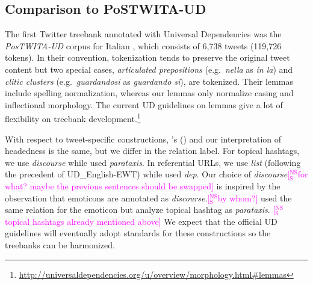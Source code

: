\documentclass[11pt,a4paper]{article}
\newcommand{\citeposs}[2][]{\citeauthor{#2}'s (\citeyear[#1]{#2})}
\newcommand{\yjcomment}[1]{\textcolor{orange}{[$_\mathrm{L}^\mathrm{Y}$#1]}}
\newcommand{\nss}[1]{\textcolor{magenta}{[$_\mathrm{S}^\mathrm{NS}$#1]}}
\begin{document}
\subsection{Comparison to PoSTWITA-UD}\label{sec:postwita}
The first Twitter treebank annotated with Universal Dependencies 
was the \mbox{\textit{PosTWITA-UD}} corpus for Italian \citep{sanguinetti-17}, 
which consists of 6,738 tweets (119,726 tokens).
In their convention, tokenization tends to preserve the original
tweet content but two special cases, \textit{articulated prepositions}
(e.g.~\textit{nella} as \textit{in la})
and \textit{clitic clusters} (e.g.~\textit{guardandosi} as \textit{guardando si}), are tokenized.
Their lemmas include spelling normalization, whereas our lemmas only normalize casing and inflectional morphology.
The current UD guidelines on lemmas give a lot of flexibility on treebank development.\footnote{\url{http://universaldependencies.org/u/overview/morphology.html\#lemmas}}

With respect to tweet-specific constructions,
\citeposs{sanguinetti-17} and our  interpretation of headedness is the same, 
but we differ in the relation label.
For topical hashtags, we use \textit{discourse} while \citet{sanguinetti-17} used \textit{parataxis}. 
In referential URLs, we use \textit{list} (following the precedent of UD\_English-EWT) while \citet{sanguinetti-17} used \textit{dep}.
Our choice of \textit{discourse}\nss{for what? maybe the previous sentences should be swapped} is inspired by the observation that emoticons are annotated as \textit{discourse}.\nss{by whom?}
\citet{sanguinetti-17} used the same relation for the emoticon but analyze topical hashtag as \textit{parataxis}.
\nss{topical hashtags already mentioned above}
We expect that the official UD guidelines will eventually adopt standards for these constructions so the treebanks can be harmonized.
\end{document}
